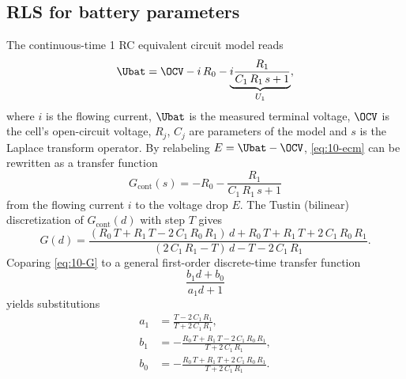 \subsection{RLS for battery parameters}

The continuous-time 1 RC equivalent circuit model reads
\begin{equation}
    \Ubat = \OCV - i \,R_0 - \underbrace{i \frac{R_1}{C_1  \,R_1\,  s+1}}_{U_1},
    \label{eq:10-ecm}
\end{equation}
where $i$ is the flowing current, $\Ubat$ is the measured terminal voltage, $\OCV$ is the cell's open-circuit voltage, $R_j$, $C_j$ are parameters of the model and $s$ is the Laplace transform operator. By relabeling $E = \Ubat - \OCV$, \eqref{eq:10-ecm} can be rewritten as a transfer function 
\begin{equation}
    G_\text{cont}(s) = -R_0 -\frac{R_1 }{C_1 \,R_1 \,s+1}
    \label{eq:10-tf}
\end{equation}
from the flowing current $i$ to the voltage drop $E$. The Tustin (bilinear) discretization of $G_\text{cont}(d)$ with step $T$ gives
\begin{equation}
    G(d) = \frac{{\left(R_0 \,T+R_1 \,T-2\,C_1 \,R_0 \,R_1 \right)}\,d+R_0 \,T+R_1 \,T+2\,C_1 \,R_0 \,R_1 }{{\left(2\,C_1 \,R_1 -T\right)}\,d-T-2\,C_1 \,R_1 }.
    \label{eq:10-G}
\end{equation}
Coparing \eqref{eq:10-G} to a general first-order discrete-time transfer function
\begin{equation}
    \frac{b_1 d + b_0}{a_1 d + 1}
\end{equation}
yields substitutions
\begin{align}
a_1 &=\frac{T-2\,C_1 \,R_1 }{T+2\,C_1 \,R_1 },\\
\label{eq:10-a1}
b_1 &=-\frac{R_0 \,T+R_1 \,T-2\,C_1 \,R_0 \,R_1 }{T+2\,C_1 \,R_1 },\\
b_0 &=-\frac{R_0 \,T+R_1 \,T+2\,C_1 \,R_0 \,R_1 }{T+2\,C_1 \,R_1 }.
\label{eq:10-b0}
\end{align}

